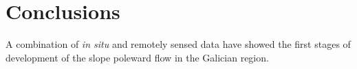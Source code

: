 

\section{Conclusions}
A combination of \emph{in situ} and remotely sensed data have
showed the first stages of development of the slope poleward flow
in the Galician region.

